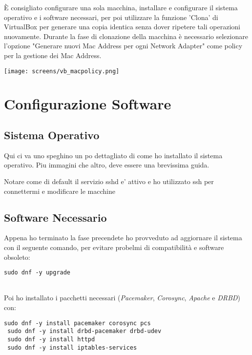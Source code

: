 \`{E} consigliato configurare una sola macchina, installare e configurare il sistema operativo e i software necessari, per poi utilizzare la funzione 'Clona' di VirtualBox per generare una copia identica senza dover ripetere tali operazioni nuovamente. Durante la fase di clonazione della macchina \`{e} necessario selezionare l'opzione "Generare nuovi Mac Address per ogni Network Adapter" come policy per la gestione dei Mac Address.

\begin{center}
	\texttt{[image: screens/vb\_macpolicy.png]}
\end{center}
 
\section{Configurazione Software}


\subsection{Sistema Operativo}

Qui ci va uno speghino un po dettagliato di come ho installato il sistema operativo. Piu immagini che altro, deve essere una brevissima guida.

Notare come di default il servizio sshd e' attivo e ho utilizzato ssh per connettermi e modificare le macchine

\subsection{Software Necessario}

Appena ho terminato la fase precendete ho provveduto ad aggiornare il sistema con il seguente comando, per evitare probelmi di compatibilit\`{a} e software obsoleto:

\begin{lstlisting}[style=cmd]
 sudo dnf -y upgrade
\end{lstlisting} 
\ \\
Poi ho installato i pacchetti necessari (\textit{Pacemaker}, \textit{Corosync}, \textit{Apache} e \textit{DRBD}) con: 

\begin{lstlisting}[style=cmd]
 sudo dnf -y install pacemaker corosync pcs
 sudo dnf -y install drbd-pacemaker drbd-udev
 sudo dnf -y install httpd
 sudo dnf -y install iptables-services
\end{lstlisting} 

